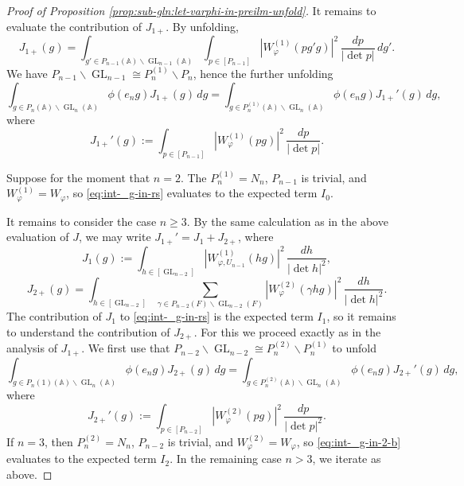 \documentclass[reqno]{amsart}
\DeclareMathOperator{\GL}{GL}
\theoremstyle{plain} \newtheorem{theorem} {Theorem}
\theoremstyle{definition} \newtheorem{definition} [theorem] {Definition}
\theoremstyle{itplain} %
\numberwithin{equation}{section}
\numberwithin{theorem}{section}
\renewcommand{\geq}{\geqslant}
\begin{document}
\begin{proof}[Proof of Proposition \ref{prop:sub-gln:let-varphi-in-preilm-unfold}]
  It remains to evaluate the contribution of $J_{1+}$.  By unfolding,
  \begin{equation*}
    J_{1+}(g) = \int _{g' \in P_{n-1}(\mathbb{A}) \backslash \GL_{n-1}(\mathbb{A})}
    \int _{p \in [P_{n-1}]} |W_{\varphi}^{(1)}(p g' g)|^2 \, \frac{d p}{|\det p|} \, d g'.
  \end{equation*}
  We have $P_{n-1} \backslash \GL_{n-1}  \cong P_{n}^{(1)} \backslash P_n$, hence the further unfolding
  \begin{equation}\label{eq:int-_g-in-rs}
    \int _{g \in P_n(\mathbb{A}) \backslash \GL_n(\mathbb{A}) } \phi(e_n g) J_{1+}(g) \, d g
    =
    \int _{g \in P_{n}^{(1)}(\mathbb{A}) \backslash \GL_n(\mathbb{A})}
    \phi(e_n g)
    J_{1+}'(g) \, d g,
  \end{equation}
  where
  \begin{equation*}
    J_{1+}'(g) := \int _{p \in [P_{n-1}]} |W_\varphi^{(1)}(p g)|^2 \, \frac{d p}{|\det p|}.
  \end{equation*}

  Suppose for the moment that $n = 2$.  The $P_{n}^{(1)} = N_n$, $P_{n-1}$ is trivial, and $W_{\varphi}^{(1)} = W_\varphi$, so \eqref{eq:int-_g-in-rs} evaluates to the expected term $I_0$.

  It remains to consider the case $n \geq 3$.  By the same calculation as in the above evaluation of $J$, we may write $J_{1+}' = J_1 + J_{2+}$, where
  \begin{equation*}
    J_1(g) := \int _{h \in [\GL_{n-2}]} |W_{\varphi,U_{n-1}}^{(1)}(h g)|^2 \, \frac{d h}{|\det h|^2},
  \end{equation*}
  \begin{equation*}
    J_{2+}(g) =
    \int _{h \in [\GL_{n-2}]}
    \sum _{\gamma \in P_{n-2}(F) \backslash \GL_{n-2}(F)}
    |W_\varphi^{(2)}(\gamma h g)|^2 \, \frac{d h}{|\det h|^2}.
  \end{equation*}
  The contribution of $J_1$ to \eqref{eq:int-_g-in-rs} is the expected term $I_1$, so it remains to understand the contribution of $J_{2+}$.  For this we proceed exactly as in the analysis of $J_{1+}$.   We first use that $P_{n-2} \backslash \GL_{n-2} \cong P_{n}^{(2)} \backslash P_n^{(1)}$ to unfold
  \begin{equation}\label{eq:int-_g-in-2-b}
    \int _{g \in P_n{(1)}(\mathbb{A}) \backslash \GL_n(\mathbb{A}) } \phi(e_n g) J_{2+}(g) \, d g
    =
    \int _{g \in P_{n}^{(2)}(\mathbb{A}) \backslash \GL_n(\mathbb{A})}
    \phi(e_n g)
    J_{2+}'(g) \, d g,
  \end{equation}
  where
  \begin{equation*}
    J_{2+}'(g) := \int _{p \in [P_{n-2}]} \left\lvert W_\varphi^{(2)}(p g) \right\rvert^2 \, \frac{d p}{|\det p|^2}.
  \end{equation*}
  If $n = 3$, then $P_{n}^{(2)} = N_n$, $P_{n-2}$ is trivial, and $W_{\varphi}^{(2)} = W_\varphi$, so \eqref{eq:int-_g-in-2-b} evaluates to the expected term $I_2$.  In the remaining case $n > 3$, we iterate as above.
\end{proof}
\end{document}
